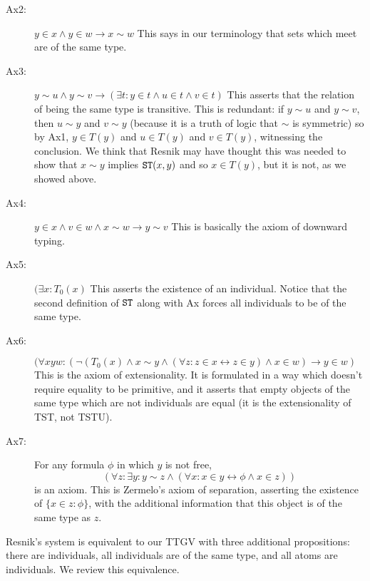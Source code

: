 \documentclass{slides}
\begin{document}
\begin{slide}
\begin{description}
\item[Ax2:]  $y \in x \wedge y \in w \rightarrow x \sim w$  This says in our terminology that sets which meet are of the same type.

\item[Ax3:]  $y \sim u \wedge y \sim v \rightarrow (\exists t:y  \in t \wedge u \in t \wedge v \in t)$  This asserts that the relation of being the same type is transitive.  This is redundant:  if $y \sim u$ and $y \sim v$, then $u \sim y$ and $v \sim y$ (because it is a truth of logic that
$\sim$ is symmetric) so by Ax1,  $y \in T(y)$ and $u \in T(y)$ and $v \in T(y)$, witnessing the conclusion.  We think that Resnik may have thought this was needed to show that $x \sim y$ implies ${\tt ST}(x,y)$ and so $x \in T(y)$, but it is not, as we showed above.

\item[Ax4:]  $y \in x \wedge v \in w \wedge x \sim w \rightarrow y \sim v$  This is basically the axiom of downward typing.

\item[Ax5:]  $(\exists x:T_0(x)$  This asserts the existence of an individual.  Notice that the second definition of ${\tt ST}$ along with Ax forces all individuals to be of the same type.

\item[Ax6:]  $(\forall xyw:  (\neg(T_0(x) \wedge x \sim y \wedge (\forall z:z \in x \leftrightarrow z \in y) \wedge x \in w) \rightarrow y \in w)$  This is the axiom of extensionality.  It is formulated in a way which doesn't require equality to be primitive, and it asserts that
empty objects of the same type which are not individuals are equal (it is the extensionality of TST, not TSTU).

\item[Ax7:]  For any formula $\phi$ in which $y$ is not free, $$(\forall z: \exists y:y \sim z \wedge (\forall x:x \in y \leftrightarrow \phi \wedge x \in z))$$ is an axiom. This is Zermelo's axiom of separation, asserting the existence of \newline $\{x \in z:\phi\}$, with the additional information that this object is of the same type as $z$.

\end{description}

\end{slide}

\begin{slide}

Resnik's system is equivalent to our TTGV with three additional propositions:  there are individuals, all individuals are of the same type, and all atoms are individuals.  We review this equivalence.

\end{slide}
\end{document}
